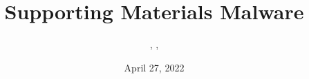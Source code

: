 \documentclass{../../../extra/styles/SecureRole}
\title{Supporting Materials Malware}
\author{\Ba, \Wi, \Zm}
\date{April 27, 2022}
\begin{document}
\makecover
\newpage

\tableofcontents
\newpage


\end{document}
